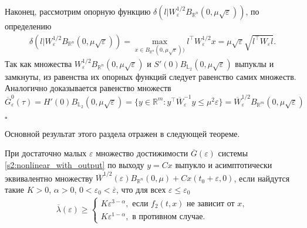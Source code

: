 \documentclass[../main.tex]{subfiles}
\begin{document}
Наконец, рассмотрим опорную функцию $\delta(l | W^{1/2}_{\varepsilon} B_{\mathbb{R}^n}(0,\mu\sqrt{\varepsilon}))$, по определению
\begin{gather*}
	\delta(l | W^{1/2}_{\varepsilon} B_{\mathbb{R}^n}(0,\mu\sqrt{\varepsilon})) = \max\limits_{x \in B_{\mathbb{R}^n}(0,\mu\sqrt{\varepsilon}))} l^{\top} W^{1/2}_{\varepsilon} x = \mu\sqrt{\varepsilon} \sqrt{l^{\top} W_{\varepsilon} l}.
\end{gather*}
Так как множества $W^{1/2}_{\varepsilon} B_{\mathbb{R}^n}(0,\mu\sqrt{\varepsilon}) $ и $S'(0) B_{\mathbb{L}_2}(0,\mu\sqrt{\varepsilon})$ выпуклы и замкнуты, из равенства их опорных функций следует равенство самих множеств. 
Аналогично доказывается равенство множеств $\overline{G}^0_{\varepsilon}(\tau) = H'(0) B_{\mathbb{L}_2}(0,\mu\sqrt{\varepsilon}) = \{ y \in \mathbb{R}^m: y^{\top} \overline{W}^{-1}_{\varepsilon} y \leqslant \mu^2 \varepsilon \} = \overline{W}^{1/2}_{\varepsilon} B_{\mathbb{R}^m}(0,\mu\sqrt{\varepsilon})$

 \hfill $\square$
 
Основной результат этого раздела отражен в следующей теореме.
\begin{theorem}\label{s2:th:assimptotic_equality}
 При достаточно малых $ \varepsilon $ множество достижимости $ \overline{G}(\varepsilon) $ системы \eqref{s2:nonlinear_with_output} по выходу $ y = C x $ выпукло и асимптотически эквивалентно множеству $\overline{W}^{1/2}(\varepsilon)B_{\mathbb{R}^n}(0,\mu) + Cx(t_0+\varepsilon,0)$, если найдутся такие $ K>0 $, $ \alpha > 0 $, $ 0< \varepsilon_0<\overline{\varepsilon} $, что для всех $ \varepsilon \leqslant \varepsilon_0 $
 \begin{gather}\label{s2:cond1}
 \overline{\lambda}(\varepsilon) \geqslant \left\{ {\begin{array}{*{20}{l}}
 {K\varepsilon ^{3 - \alpha}, \mbox{\ если \ } f_2(t,x) \mbox{\ не зависит от \ } x}, \\
 {K\varepsilon ^{1 - \alpha}}, \mbox{\ в противном случае}.
 \end{array}} \right.
 \end{gather}
\end{theorem}
 
\end{document}

